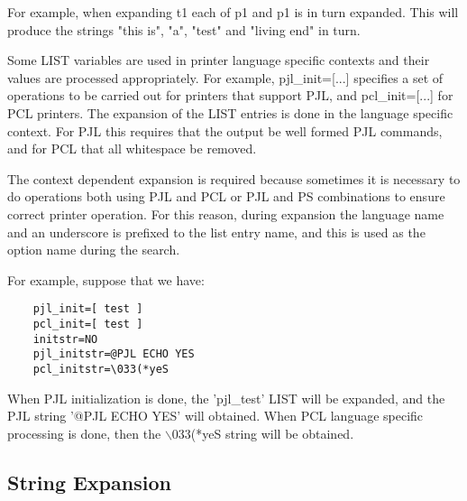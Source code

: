 \documentclass[a4paper]{article}
\begin{document}
For example,
when expanding
{\ttfamily t1}
each of
{\ttfamily p1}
and
{\ttfamily p1}
is in turn expanded.
This will produce the strings
{\ttfamily "this is"},
{\ttfamily "a"},
{\ttfamily "test"}
and
{\ttfamily "living end"}
in turn.

Some LIST variables are used in
printer language specific contexts
and their values are processed appropriately.
For example,
pjl\_init={[}...{]} specifies a set of operations to be carried
out for printers that support PJL,
and pcl\_init={[}...{]} for PCL
printers.  The expansion of the LIST entries is done in the language
specific context.
For PJL this requires that the output be well formed PJL commands,
and for PCL that all whitespace be removed.

The context dependent expansion is required because sometimes it
is necessary to do operations both using PJL and PCL or PJL and PS
combinations to ensure correct printer operation.
For this reason,  during expansion the language name and an underscore
is prefixed to the list entry name,  and this is used as the option name during the search.

For example,  suppose that we have:
\begin{tscreen}
\begin{verbatim}
    pjl_init=[ test ]
    pcl_init=[ test ]
    initstr=NO
    pjl_initstr=@PJL ECHO YES
    pcl_initstr=\033(*yeS
\end{verbatim}
\end{tscreen}


When PJL initialization is done, the 'pjl\_test' LIST will be
expanded, and the PJL string '@PJL ECHO YES' will obtained.
When PCL language specific processing is done,  then the
$\backslash$033(*yeS string will be obtained.


\subsection{String Expansion}
\end{document}
